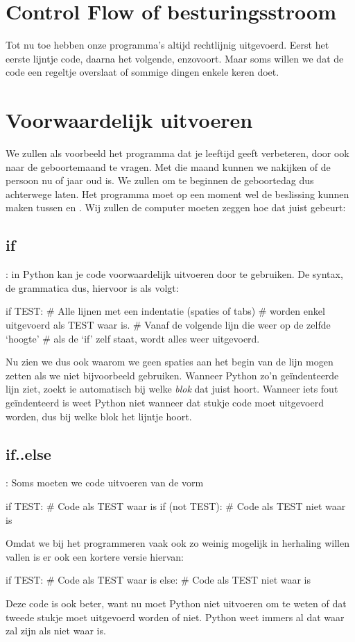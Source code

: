 
\section*{Control Flow of besturingsstroom}
  Tot nu toe hebben onze programma's altijd rechtlijnig uitgevoerd. Eerst het
  eerste lijntje code, daarna het volgende, enzovoort. Maar soms willen we dat
  de code een regeltje overslaat of sommige dingen enkele keren doet.
\section{Voorwaardelijk uitvoeren}
  We zullen als voorbeeld het programma dat je leeftijd geeft verbeteren, door
  ook naar de geboortemaand te vragen. Met die maand kunnen we nakijken of de
  persoon nu  of  jaar oud is. We zullen om te
  beginnen de geboortedag dus achterwege laten. Het programma moet op een moment
  wel de beslissing kunnen maken tussen  en . Wij
  zullen de computer moeten zeggen hoe dat juist gebeurt:
  \subsection{if}: in Python kan je code voorwaardelijk uitvoeren door 
  te gebruiken. De syntax, de grammatica dus, hiervoor is als volgt:
  \begin{python}
    if TEST:
      # Alle lijnen met een indentatie (spaties of tabs)
      # worden enkel uitgevoerd als TEST waar is.
    # Vanaf de volgende lijn die weer op de zelfde `hoogte'
    # als de `if' zelf staat, wordt alles weer uitgevoerd.
  \end{python}
  Nu zien we dus ook waarom we geen spaties aan het begin van de lijn mogen
  zetten als we niet bijvoorbeeld  gebruiken. Wanneer Python zo'n
  ge\"indenteerde lijn ziet, zoekt ie automatisch bij welke \emph{blok} dat
  juist hoort. Wanneer iets fout ge\"indenteerd is weet Python niet wanneer dat
  stukje code moet uitgevoerd worden, dus bij welke blok het lijntje hoort.

  \subsection{if..else}: Soms moeten we code uitvoeren van de vorm
  \begin{python}
    if TEST:
      # Code als TEST waar is
    if (not TEST):
      # Code als TEST niet waar is
  \end{python}
  Omdat we bij het programmeren vaak ook zo weinig mogelijk in herhaling willen
  vallen is er ook een kortere versie hiervan:
  \begin{python}
    if TEST:
      # Code als TEST waar is
    else:
      # Code als TEST niet waar is
  \end{python}
  Deze code is ook beter, want nu moet Python niet  uitvoeren
  om te weten of dat tweede stukje moet uitgevoerd worden of niet. Python weet
  immers al dat  waar zal zijn als  niet waar is.

